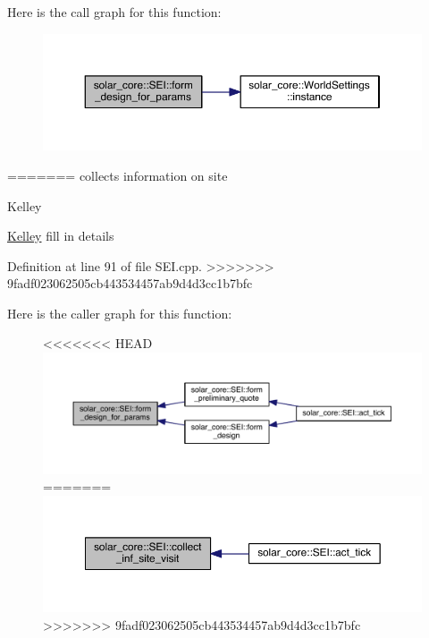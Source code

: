 Here is the call graph for this function\+:
\nopagebreak
\begin{figure}[H]
\begin{center}
\leavevmode
\includegraphics[width=350pt]{classsolar__core_1_1_s_e_i_a0019e2ad3504adcb5a44e5002f1d0002_cgraph}
\end{center}
\end{figure}

=======
collects information on site \begin{DoxyRefDesc}{Kelley}
\item[\hyperlink{_kelley__Kelley000002}{Kelley}]fill in details \end{DoxyRefDesc}


Definition at line 91 of file S\+E\+I.\+cpp.
>>>>>>> 9fadf023062505cb443534457ab9d4d3cc1b7bfc



Here is the caller graph for this function\+:
\nopagebreak
\begin{figure}[H]
\begin{center}
\leavevmode
<<<<<<< HEAD
\includegraphics[width=350pt]{classsolar__core_1_1_s_e_i_a0019e2ad3504adcb5a44e5002f1d0002_icgraph}
=======
\includegraphics[width=350pt]{classsolar__core_1_1_s_e_i_abdcbd57fa145ee55eb8455a8bc3b4c7c_icgraph}
>>>>>>> 9fadf023062505cb443534457ab9d4d3cc1b7bfc
\end{center}
\end{figure}


